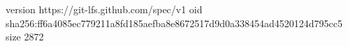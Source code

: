 version https://git-lfs.github.com/spec/v1
oid sha256:ff6a4085ec779211a8fd185aefba8e8672517d9d0a338454ad4520124d795cc5
size 2872
